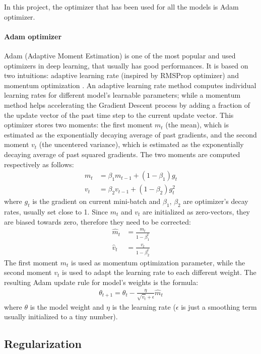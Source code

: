 In this project, the optimizer that has been used for all the models is Adam optimizer.

\paragraph{Adam optimizer} Adam (Adaptive Moment Estimation) is one of the most popular and used optimizers in deep learning, that usually has good performances. It is based on two intuitions: adaptive learning rate (inspired by RMSProp optimizer) and momentum optimization \cite{arXiv:adam} \cite{arXiv:optimizers}. An adaptive learning rate method computes individual learning rates for different model's learnable parameters; while a momentum method helps accelerating the Gradient Descent process by adding a fraction of the update vector of the past time step to the current update vector. This optimizer stores two moments: the first moment $m_t$ (the mean), which is estimated as the exponentially decaying average of past gradients, and the second moment $v_t$ (the uncentered variance), which is estimated as the exponentially decaying average of past squared gradients. The two moments are computed respectively as follows:
\begin{align}
    m_{t} &=\beta_{1} m_{t-1}+\left(1-\beta_{1}\right) g_{t} \\
    v_{t} &=\beta_{2} v_{t-1}+\left(1-\beta_{2}\right) g_{t}^{2}
\end{align}
where $g_{t}$ is the gradient on current mini-batch and $\beta_1$, $\beta_2$ are optimizer's decay rates, usually set close to 1. Since $m_t$ and $v_t$ are initialized as zero-vectors, they are biased towards zero, therefore they need to be corrected:
\begin{align}
    \hat{m}_{t} &=\frac{m_{t}}{1-\beta_{1}^{t}} \\
    \hat{v}_{t} &=\frac{v_{t}}{1-\beta_{2}^{t}}
\end{align}
The first moment $m_t$ is used as momentum optimization parameter, while the second moment $v_t$ is used to adapt the learning rate to each different weight. The resulting Adam update rule for model's weights is the formula:
\begin{align}
    \theta_{t+1}=\theta_{t}-\frac{\eta}{\sqrt{\hat{v}_{t}}+\epsilon} \hat{m}_{t}
\end{align}
where $\theta$ is the model weight and $\eta$ is the learning rate ($\epsilon$ is just a smoothing term usually initialized to a tiny number).

\subsection{Regularization}
